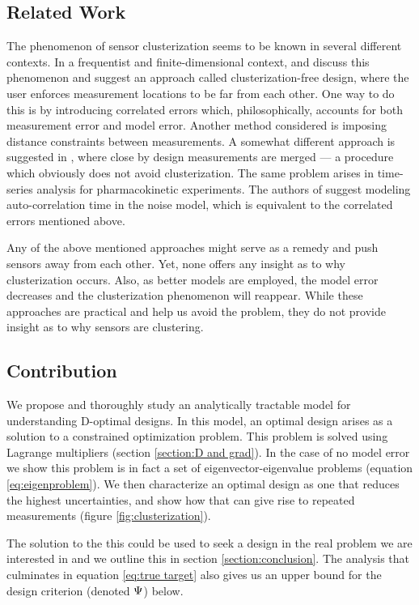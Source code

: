 \documentclass{amsart}
\numberwithin{equation}{section}
\begin{document}
\subsection{Related Work}
The phenomenon of sensor clusterization seems to be known in several
different contexts. In a frequentist and finite-dimensional context,
\cite{Fedorov96} and \cite[chapter 2.4.3]{Ucinski05} discuss this
phenomenon and suggest an approach called clusterization-free design,
where the user enforces measurement locations to be far from each
other. One way to do this is by introducing correlated errors which,
philosophically, accounts for both measurement error and model error.
Another method considered is imposing distance constraints between
measurements. A somewhat different approach is suggested in \cite[page
  49]{Fedorov12}, where close by design measurements are merged --- a
procedure which obviously does not avoid clusterization. The same problem
arises in time-series analysis for pharmacokinetic experiments. The
authors of \cite{Hooker09} suggest modeling auto-correlation time in
the noise model, which is equivalent to the correlated errors
mentioned above.

Any of the above mentioned approaches might serve as a remedy and push
sensors away from each other. Yet, none offers any insight as to why
clusterization occurs. Also, as better models are employed, the model
error decreases and the clusterization phenomenon will reappear. While
these approaches are practical and help us avoid the problem, they do
not provide insight as to why sensors are clustering.

\subsection{Contribution}
We propose and thoroughly study an analytically tractable model for
understanding D-optimal designs. In this model, an optimal design
arises as a solution to a constrained optimization problem. This
problem is solved using Lagrange multipliers (section \ref{section:D
  and grad}). In the case of no model error we show this problem is in
fact a set of eigenvector-eigenvalue problems (equation
\eqref{eq:eigenproblem}). We then characterize an optimal design as
one that reduces the highest uncertainties, and show how that can give
rise to repeated measurements (figure \ref{fig:clusterization}).

The solution to the this could be used to seek a design in the real
problem we are interested in and we outline this in section
\ref{section:conclusion}. The analysis that culminates in equation
\eqref{eq:true target} also gives us an upper bound for the design
criterion (denoted $\Psi$) below.
\end{document}
